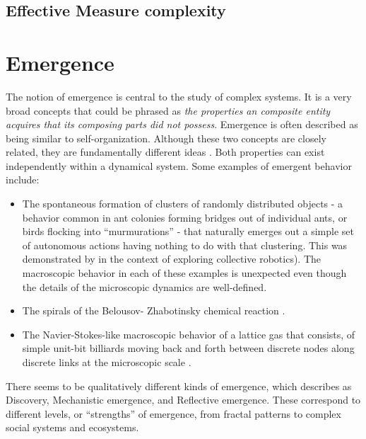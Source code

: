 \subsection{Effective Measure complexity}

\parencite{grassbergerQuantitativeTheorySelfgenerated1986,
  gell-mannInformationMeasuresEffective1996}

\section{Emergence}\label{sec:emergence}
The notion of emergence is central to the study of complex systems. It is a very
broad concepts that could be phrased as \emph{the properties an composite entity
  acquires that its composing parts did not possess}. Emergence is often described
as being similar to self-organization. Although these two concepts are closely
related, they are fundamentally different ideas
\parencite{dewolfEmergenceSelfOrganisationDifferent2005}. Both properties can
exist independently within a dynamical system.
Some examples of emergent behavior include:

\begin{itemize}
  \item The spontaneous formation of clusters of randomly distributed objects -
        a behavior common in ant colonies forming bridges out of individual
        ants, or birds flocking into ``murmurations'' - that naturally emerges
        out a simple set of autonomous actions having nothing to do with that
        clustering. This was demonstrated by
        \textcite{beckersFomLocalActions2000} in the context of exploring
        collective robotics). The macroscopic behavior in each of these examples
        is unexpected even though the details of the microscopic dynamics are
        well-defined.
  \item The spirals of the Belousov- Zhabotinsky chemical reaction
        \parencite{tysonBelousovZhabotinskiiReaction2013}.
  \item The Navier-Stokes-like macroscopic behavior of a lattice gas that
        consists, of simple unit-bit billiards moving back and forth between
        discrete nodes along discrete links at the microscopic scale
        \parencite{hasslacherDiscreteFluids1987}.
\end{itemize}

There seems to be qualitatively different kinds of emergence, which
\textcite{dehaanHowEmergenceArises2006} describes as Discovery, Mechanistic
emergence, and Reflective emergence. These correspond to different levels, or
``strengths'' of emergence, from fractal patterns to complex social systems and
ecosystems.

